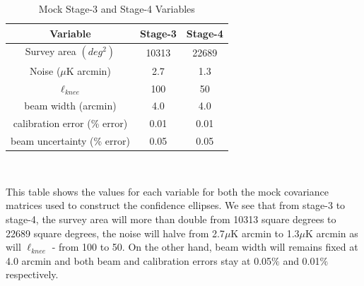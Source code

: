 \begin{table}[h]
\centering
\caption{Mock Stage-3 and Stage-4 Variables}

\label{table: stage-stats}
\begin{tabular}{l|l|l}
\multicolumn{1}{c}{Variable} & \multicolumn{1}{|c}{Stage-3} & \multicolumn{1}{|c}{Stage-4} \\ \hline
\multicolumn{1}{c}{Survey area $(deg^2)$} & \multicolumn{1}{|c}{10313} & \multicolumn{1}{|c}{22689}  \\
\multicolumn{1}{c}{Noise ($\mu$K arcmin)} & \multicolumn{1}{|c}{2.7} & \multicolumn{1}{|c}{1.3}  \\
\multicolumn{1}{c}{$\ell_{knee}$} & \multicolumn{1}{|c}{100} & \multicolumn{1}{|c}{50} \\
\multicolumn{1}{c}{beam width (arcmin)} & \multicolumn{1}{|c}{4.0} & \multicolumn{1}{|c}{4.0}   \\
\multicolumn{1}{c}{calibration error (\% error)} & \multicolumn{1}{|c}{0.01} & \multicolumn{1}{|c}{0.01} \\
\multicolumn{1}{c}{beam uncertainty (\% error)} & \multicolumn{1}{|c}{0.05} & \multicolumn{1}{|c}{0.05}
\end{tabular}
\\
\begin{flushleft}
This table shows the values for each variable for both the mock covariance matrices used to construct the confidence ellipses. We see that from stage-3 to stage-4, the survey area will more than double from 10313 square degrees to 22689 square degrees, the noise will halve from 2.7$\mu$K arcmin to 1.3$\mu$K arcmin as will $\ell_{knee}$ - from 100 to 50. On the other hand, beam width will remains fixed at 4.0 arcmin and both beam and calibration errors stay at 0.05$\%$ and 0.01$\%$ respectively.
\end{flushleft}
\end{table}

